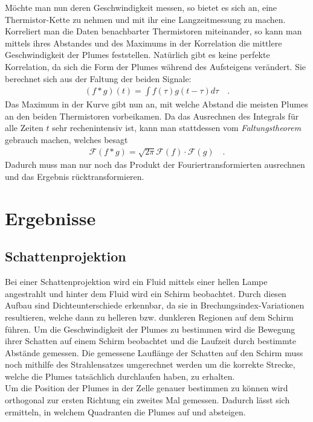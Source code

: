 \documentclass[12pt,a4paper,titlepage,headinclude]{scrartcl}
\numberwithin{equation}{subsection}
\begin{document}
Möchte man nun deren Geschwindigkeit messen, so bietet es sich an, eine Thermistor-Kette zu nehmen und mit ihr eine Langzeitmessung zu machen.
Korreliert man die Daten benachbarter Thermistoren miteinander, so kann man mittels ihres Abstandes und des Maximums in der Korrelation die mittlere Geschwindigkeit der Plumes feststellen.
Natürlich gibt es keine perfekte Korrelation, da sich die Form der Plumes während des Aufsteigens verändert.
Sie berechnet sich aus der Faltung der beiden Signale:
\begin{align}
	(f*g)(t)=\int f(\tau)g(t-\tau) d\tau\quad.
	\label{eq:faltung}
\end{align}
Das Maximum in der Kurve gibt nun an, mit welche Abstand die meisten Plumes an den beiden Thermistoren vorbeikamen.
Da das Ausrechnen des Integrals f\"ur alle Zeiten $t$ sehr rechenintensiv ist, kann man stattdessen vom \textit{Faltungstheorem} gebrauch machen, welches besagt
\begin{align}
	\mathcal F(f*g)=\sqrt{2\pi}\mathcal F(f)\cdot\mathcal F(g)\quad.
	\label{eq:faltungssatz}
\end{align}
Dadurch muss man nur noch das Produkt der Fouriertransformierten ausrechnen und das Ergebnis r\"ucktransformieren.


\newpage
\section{Ergebnisse}
\label{sec:auswertung}

\subsection{Schattenprojektion}
\label{sec:schatte}
Bei einer Schattenprojektion wird ein Fluid mittels einer hellen Lampe angestrahlt und hinter dem Fluid wird ein Schirm beobachtet.
Durch diesen Aufbau sind Dichteunterschiede erkennbar, da sie in Brechungsindex-Variationen resultieren, welche dann zu helleren bzw. dunkleren Regionen auf dem Schirm führen.
Um die Geschwindigkeit der Plumes zu bestimmen wird die Bewegung ihrer Schatten auf einem Schirm beobachtet und die Laufzeit durch bestimmte Abstände gemessen.
Die gemessene Lauflänge der Schatten auf den Schirm muss noch mithilfe des Strahlensatzes umgerechnet werden um die korrekte Strecke, welche die Plumes tatsächlich durchlaufen haben, zu erhalten.\\

Um die Position der Plumes in der Zelle genauer bestimmen zu können wird orthogonal zur ersten Richtung ein zweites Mal gemessen.
Dadurch lässt sich ermitteln, in welchem Quadranten die Plumes auf und absteigen.
\\
\end{document}
